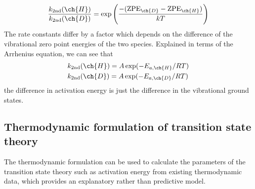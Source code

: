 \begin{equation}
  \frac{k_{\text{2nd}}(\ch{H})}{k_{\text{2nd}}(\ch{D})}=\exp \lf(\frac{-(\text{ZPE}_{\ch{D}}-\text{ZPE}_{\ch{H}})}{kT} \rt)
\end{equation}
The rate constants differ by a factor which depends on the difference of the vibrational zero point energies of the two species. Explained in terms of the Arrhenius equation, we can see that
\begin{equation}
\begin{aligned}
  &k_{\text{2nd}}(\ch{H})=A\exp(-E_{a,\ch{H}}/RT)\\
  &k_{\text{2nd}}(\ch{D})=A\exp(-E_{a,\ch{D}}/RT)
\end{aligned}
\end{equation}
the difference in activation energy is just the difference in the vibrational ground states.
\subsection{Thermodynamic formulation of transition state theory}
The thermodynamic formulation can be used to calculate the parameters of the transition state theory such as activation energy from existing thermodynamic data, which provides an explanatory rather than predictive model.
